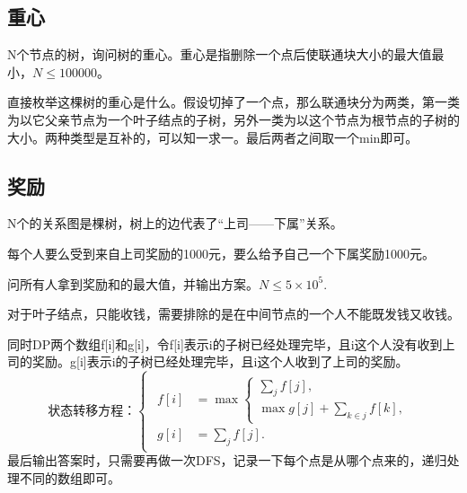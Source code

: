 \documentclass{article}
\begin{document}
\subsection{重心}
N个节点的树，询问树的重心。重心是指删除一个点后使联通块大小的最大值最小，$N\le 100000$。

直接枚举这棵树的重心是什么。假设切掉了一个点，那么联通块分为两类，第一类为以它父亲节点为一个叶子结点的子树，另外一类为以这个节点为根节点的子树的大小。两种类型是互补的，可以知一求一。最后两者之间取一个min即可。
\subsection{奖励}
N个的关系图是棵树，树上的边代表了“上司——下属”关系。

每个人要么受到来自上司奖励的1000元，要么给予自己一个下属奖励1000元。

问所有人拿到奖励和的最大值，并输出方案。$N\le 5\times 10^5$.

对于叶子结点，只能收钱，需要排除的是在中间节点的一个人不能既发钱又收钱。

同时DP两个数组f[i]和g[i]，令f[i]表示i的子树已经处理完毕，且i这个人没有收到上司的奖励。g[i]表示i的子树已经处理完毕，且i这个人收到了上司的奖励。
\begin{equation*}
    状态转移方程：
    \begin{cases}
        \begin{aligned}
            f[i]&=\max
            \begin{cases}
                \sum_jf[j],\\
                \max g[j]+\sum_{k\in j}f[k],
            \end{cases}
            \\
            g[i]&=\sum_jf[j].
        \end{aligned}
    \end{cases}
\end{equation*}
最后输出答案时，只需要再做一次DFS，记录一下每个点是从哪个点来的，递归处理不同的数组即可。
\end{document}
